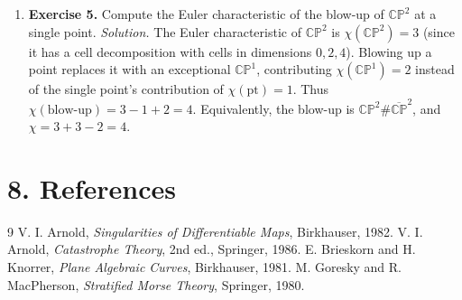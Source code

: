 \begin{enumerate}[leftmargin=*,itemsep=0.9em]
\item \textbf{Exercise 5.} Compute the Euler characteristic of the blow-up of $\mathbb{CP}^2$ at a single point. \emph{Solution.} The Euler characteristic of $\mathbb{CP}^2$ is $\chi(\mathbb{CP}^2) = 3$ (since it has a cell decomposition with cells in dimensions $0, 2, 4$). Blowing up a point replaces it with an exceptional $\mathbb{CP}^1$, contributing $\chi(\mathbb{CP}^1) = 2$ instead of the single point's contribution of $\chi(\text{pt}) = 1$. Thus $\chi(\text{blow-up}) = 3 - 1 + 2 = 4$. Equivalently, the blow-up is $\mathbb{CP}^2 \# \overline{\mathbb{CP}}^2$, and $\chi = 3 + 3 - 2 = 4$.

\end{enumerate}
\section*{8. References}
\begin{thebibliography}{9}
 V. I. Arnold, \emph{Singularities of Differentiable Maps}, Birkhauser, 1982.
 V. I. Arnold, \emph{Catastrophe Theory}, 2nd ed., Springer, 1986.
 E. Brieskorn and H. Knorrer, \emph{Plane Algebraic Curves}, Birkhauser, 1981.
 M. Goresky and R. MacPherson, \emph{Stratified Morse Theory}, Springer, 1980.
\end{thebibliography}
